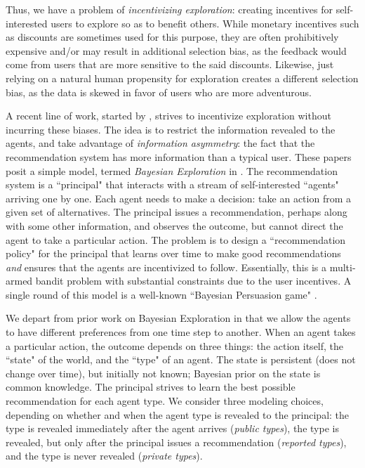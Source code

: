 Thus, we have a problem of \emph{incentivizing exploration}: creating incentives for self-interested users to explore so as to benefit others. While monetary incentives such as discounts are sometimes used for this purpose, they are often prohibitively expensive and/or may result in additional selection bias, as the feedback would come from users that are more sensitive to the said discounts. Likewise, just relying on a natural human propensity for exploration creates a different selection bias, as the data is skewed in favor of users who are more adventurous.

A recent line of work, started by \cite{Kremer-JPE14}, strives to incentivize exploration without incurring these biases. The idea is to restrict the information revealed to the agents, and take advantage of \emph{information asymmetry}: the fact that the recommendation system has more information than a typical user. These papers posit a simple model, termed \emph{Bayesian Exploration} in \cite{ICexplorationGames-ec16}. The recommendation system is a ``principal" that interacts with a stream of self-interested ``agents" arriving one by one. Each agent needs to make a decision: take an action from a given set of alternatives. The principal issues a recommendation, perhaps along with some other information, and observes the outcome, but cannot direct the agent to take a particular action. The problem is to design a ``recommendation policy" for the principal that learns over time to make good recommendations \emph{and} ensures that the agents are incentivized to follow. Essentially, this is a multi-armed bandit problem with substantial constraints due to the user incentives. A single round of this model is a well-known ``Bayesian Persuasion game" \cite{Kamenica-aer11}.

We depart from prior work on Bayesian Exploration in that we allow the agents to have different preferences from one time step to another. When an agent takes a particular action, the outcome depends on three things: the action itself, the ``state" of the world, and the ``type" of an agent. The state is persistent (does not change over time), but initially not known; Bayesian prior on the state is common knowledge. The principal strives to learn the best possible recommendation for each agent type. We consider three modeling choices, depending on whether and when the agent type is revealed to the principal: the type is revealed immediately after the agent arrives (\emph{public types}), the type is revealed, but only after the principal issues a recommendation (\emph{reported types}), and the type is never revealed (\emph{private types}). 

